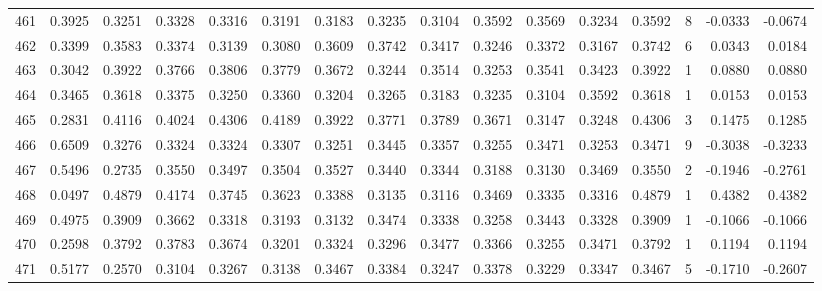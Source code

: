 \begin{tabular}{lrrrrrrrrrrrrrrr}
461 &      0.3925 &  0.3251 &  0.3328 &  0.3316 &  0.3191 &  0.3183 &  0.3235 &  0.3104 &  0.3592 &  0.3569 &   0.3234 &     0.3592 &      8 &                   -0.0333 &                    -0.0674 \\
462 &      0.3399 &  0.3583 &  0.3374 &  0.3139 &  0.3080 &  0.3609 &  0.3742 &  0.3417 &  0.3246 &  0.3372 &   0.3167 &     0.3742 &      6 &                    0.0343 &                     0.0184 \\
463 &      0.3042 &  0.3922 &  0.3766 &  0.3806 &  0.3779 &  0.3672 &  0.3244 &  0.3514 &  0.3253 &  0.3541 &   0.3423 &     0.3922 &      1 &                    0.0880 &                     0.0880 \\
464 &      0.3465 &  0.3618 &  0.3375 &  0.3250 &  0.3360 &  0.3204 &  0.3265 &  0.3183 &  0.3235 &  0.3104 &   0.3592 &     0.3618 &      1 &                    0.0153 &                     0.0153 \\
465 &      0.2831 &  0.4116 &  0.4024 &  0.4306 &  0.4189 &  0.3922 &  0.3771 &  0.3789 &  0.3671 &  0.3147 &   0.3248 &     0.4306 &      3 &                    0.1475 &                     0.1285 \\
466 &      0.6509 &  0.3276 &  0.3324 &  0.3324 &  0.3307 &  0.3251 &  0.3445 &  0.3357 &  0.3255 &  0.3471 &   0.3253 &     0.3471 &      9 &                   -0.3038 &                    -0.3233 \\
467 &      0.5496 &  0.2735 &  0.3550 &  0.3497 &  0.3504 &  0.3527 &  0.3440 &  0.3344 &  0.3188 &  0.3130 &   0.3469 &     0.3550 &      2 &                   -0.1946 &                    -0.2761 \\
468 &      0.0497 &  0.4879 &  0.4174 &  0.3745 &  0.3623 &  0.3388 &  0.3135 &  0.3116 &  0.3469 &  0.3335 &   0.3316 &     0.4879 &      1 &                    0.4382 &                     0.4382 \\
469 &      0.4975 &  0.3909 &  0.3662 &  0.3318 &  0.3193 &  0.3132 &  0.3474 &  0.3338 &  0.3258 &  0.3443 &   0.3328 &     0.3909 &      1 &                   -0.1066 &                    -0.1066 \\
470 &      0.2598 &  0.3792 &  0.3783 &  0.3674 &  0.3201 &  0.3324 &  0.3296 &  0.3477 &  0.3366 &  0.3255 &   0.3471 &     0.3792 &      1 &                    0.1194 &                     0.1194 \\
471 &      0.5177 &  0.2570 &  0.3104 &  0.3267 &  0.3138 &  0.3467 &  0.3384 &  0.3247 &  0.3378 &  0.3229 &   0.3347 &     0.3467 &      5 &                   -0.1710 &                    -0.2607 \\

\end{tabular}

